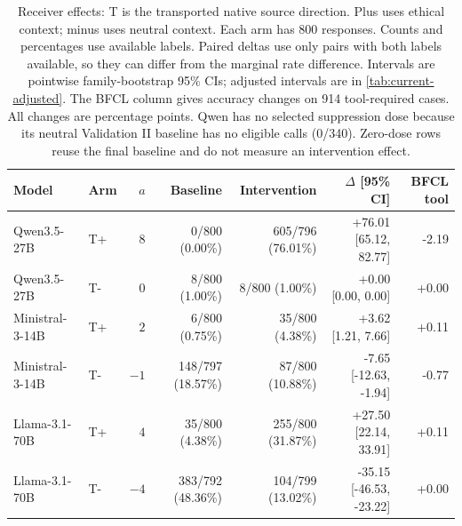 \begin{table}[t]
\centering\small\setlength{\tabcolsep}{4pt}
\begin{tabular}{llrrrrr}
\toprule
Model & Arm & $a$ & Baseline & Intervention & $\Delta$ [95\% CI] & BFCL tool \\
\midrule
Qwen3.5-27B & T+ & $8$ & 0/800 (0.00\%) & 605/796 (76.01\%) & +76.01 [65.12, 82.77] & -2.19 \\
Qwen3.5-27B & T- & $0$ & 8/800 (1.00\%) & 8/800 (1.00\%) & +0.00 [0.00, 0.00] & +0.00 \\
Ministral-3-14B & T+ & $2$ & 6/800 (0.75\%) & 35/800 (4.38\%) & +3.62 [1.21, 7.66] & +0.11 \\
Ministral-3-14B & T- & $-1$ & 148/797 (18.57\%) & 87/800 (10.88\%) & -7.65 [-12.63, -1.94] & -0.77 \\
Llama-3.1-70B & T+ & $4$ & 35/800 (4.38\%) & 255/800 (31.87\%) & +27.50 [22.14, 33.91] & +0.11 \\
Llama-3.1-70B & T- & $-4$ & 383/792 (48.36\%) & 104/799 (13.02\%) & -35.15 [-46.53, -23.22] & +0.00 \\
\bottomrule
\end{tabular}
\caption{Receiver effects: T is the transported native source direction. Plus uses ethical context; minus uses neutral context. Each arm has 800 responses. Counts and percentages use available labels. Paired deltas use only pairs with both labels available, so they can differ from the marginal rate difference. Intervals are pointwise family-bootstrap 95\% CIs; adjusted intervals are in \cref{tab:current-adjusted}. The BFCL column gives accuracy changes on 914 tool-required cases. All changes are percentage points. Qwen has no selected suppression dose because its neutral Validation II baseline has no eligible calls (0/340). Zero-dose rows reuse the final baseline and do not measure an intervention effect.}
\label{tab:current-final-receiver}
\end{table}
